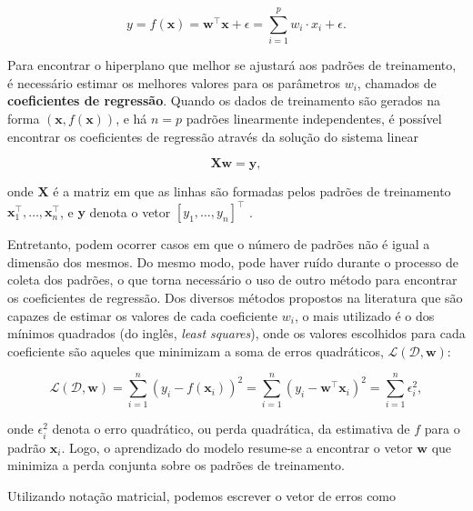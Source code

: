\begin{equation}
    \label{ch2:eq2}
    y = f(\mathbf{x}) = \mathbf{w}^{\top}\mathbf{x} + \epsilon = \sum_{i=1}^{p}{w_i \cdot x_i} + \epsilon.
\end{equation}

Para encontrar o hiperplano que melhor se ajustará aos padrões de treinamento, é necessário estimar os melhores valores para os parâmetros $w_i$, chamados de \textbf{coeficientes de regressão}. Quando os dados de treinamento são gerados na forma $(\mathbf{x}, f(\mathbf{x}))$, e há $n = p$ padrões linearmente independentes, é possível encontrar os coeficientes de regressão através da solução do sistema linear

\begin{equation}
    \label{ch2:eq3}
    \mathbf{X}\mathbf{w} = \mathbf{y},
\end{equation}

\noindent onde $\mathbf{X}$ é a matriz em que as linhas são formadas pelos padrões de treinamento $\mathbf{x}^{\top}_1,\ldots,\mathbf{x}^{\top}_n$, e $\mathbf{y}$ denota o vetor $[y_1,\ldots,y_n]^{\top}$ \cite{shawe2004}.

Entretanto, podem ocorrer casos em que o número de padrões não é igual a dimensão dos mesmos. Do mesmo modo, pode haver ruído durante o processo de coleta dos padrões, o que torna necessário o uso de outro método para encontrar os coeficientes de regressão. Dos diversos métodos propostos na literatura que são capazes de estimar os valores de cada coeficiente $w_i$, o mais utilizado é o dos mínimos quadrados (do inglês, \textit{least squares}), onde os valores escolhidos para cada coeficiente são aqueles que minimizam a soma de erros quadráticos, $\mathcal{L}(\mathcal{D}, \mathbf{w})$:

\begin{equation}
    \label{ch2:eq4}
    \mathcal{L}(\mathcal{D}, \mathbf{w}) = \sum_{i=1}^{n}{(y_i - f(\mathbf{x}_i))^2} = \sum_{i=1}^{n}{(y_i - \mathbf{w}^{\top}\mathbf{x}_i)^2} = \sum_{i=1}^{n}{\epsilon_{i}^2},
\end{equation}

\noindent onde $\epsilon_{i}^2$ denota o erro quadrático, ou perda quadrática, da estimativa de $f$ para o padrão $\mathbf{x}_i$. Logo, o aprendizado do modelo resume-se a encontrar o vetor $\mathbf{w}$ que minimiza a perda conjunta sobre os padrões de treinamento.

Utilizando notação matricial, podemos escrever o vetor de erros como

